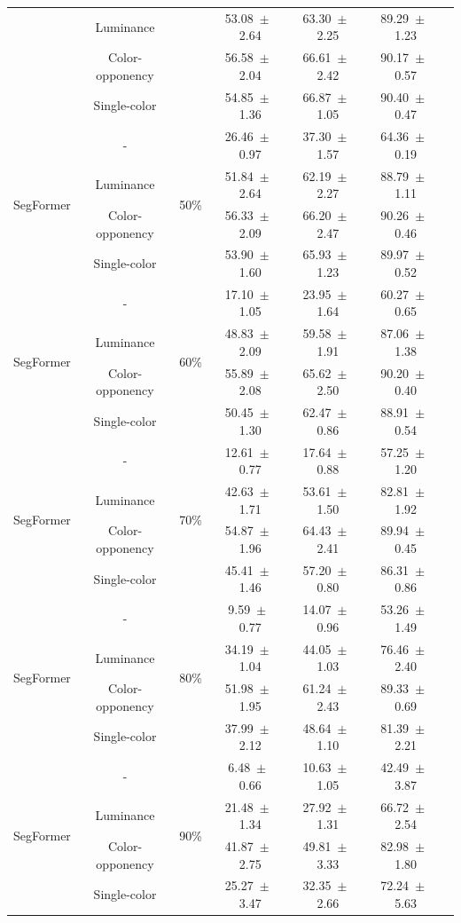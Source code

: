 \begin{table}[h]
\begin{tabular}{@{}lccc ccc@{}}
& Luminance & & 53.08~$\pm$~2.64 & 63.30~$\pm$~2.25 & 89.29~$\pm$~1.23 \\
& Color-opponency & & 56.58~$\pm$~2.04 & 66.61~$\pm$~2.42 & 90.17~$\pm$~0.57 \\
& Single-color & & 54.85~$\pm$~1.36 & 66.87~$\pm$~1.05 & 90.40~$\pm$~0.47 \\
\midrule
\multirow{4}{*}{SegFormer} & - & \multirow{4}{*}{50\%} & 26.46~$\pm$~0.97 & 37.30~$\pm$~1.57 & 64.36~$\pm$~0.19 \\
& Luminance & & 51.84~$\pm$~2.64 & 62.19~$\pm$~2.27 & 88.79~$\pm$~1.11 \\
& Color-opponency & & 56.33~$\pm$~2.09 & 66.20~$\pm$~2.47 & 90.26~$\pm$~0.46 \\
& Single-color & & 53.90~$\pm$~1.60 & 65.93~$\pm$~1.23 & 89.97~$\pm$~0.52 \\
\midrule
\multirow{4}{*}{SegFormer} & - & \multirow{4}{*}{60\%} & 17.10~$\pm$~1.05 & 23.95~$\pm$~1.64 & 60.27~$\pm$~0.65 \\
& Luminance & & 48.83~$\pm$~2.09 & 59.58~$\pm$~1.91 & 87.06~$\pm$~1.38 \\
& Color-opponency & & 55.89~$\pm$~2.08 & 65.62~$\pm$~2.50 & 90.20~$\pm$~0.40 \\
& Single-color & & 50.45~$\pm$~1.30 & 62.47~$\pm$~0.86 & 88.91~$\pm$~0.54 \\
\midrule
\multirow{4}{*}{SegFormer} & - & \multirow{4}{*}{70\%} & 12.61~$\pm$~0.77 & 17.64~$\pm$~0.88 & 57.25~$\pm$~1.20 \\
& Luminance & & 42.63~$\pm$~1.71 & 53.61~$\pm$~1.50 & 82.81~$\pm$~1.92 \\
& Color-opponency & & 54.87~$\pm$~1.96 & 64.43~$\pm$~2.41 & 89.94~$\pm$~0.45 \\
& Single-color & & 45.41~$\pm$~1.46 & 57.20~$\pm$~0.80 & 86.31~$\pm$~0.86 \\
\midrule
\multirow{4}{*}{SegFormer} & - & \multirow{4}{*}{80\%} & 9.59~$\pm$~0.77 & 14.07~$\pm$~0.96 & 53.26~$\pm$~1.49 \\
& Luminance & & 34.19~$\pm$~1.04 & 44.05~$\pm$~1.03 & 76.46~$\pm$~2.40 \\
& Color-opponency & & 51.98~$\pm$~1.95 & 61.24~$\pm$~2.43 & 89.33~$\pm$~0.69 \\
& Single-color & & 37.99~$\pm$~2.12 & 48.64~$\pm$~1.10 & 81.39~$\pm$~2.21 \\
\midrule
\multirow{4}{*}{SegFormer} & - & \multirow{4}{*}{90\%} & 6.48~$\pm$~0.66 & 10.63~$\pm$~1.05 & 42.49~$\pm$~3.87 \\
& Luminance & & 21.48~$\pm$~1.34 & 27.92~$\pm$~1.31 & 66.72~$\pm$~2.54 \\
& Color-opponency & & 41.87~$\pm$~2.75 & 49.81~$\pm$~3.33 & 82.98~$\pm$~1.80 \\
& Single-color & & 25.27~$\pm$~3.47 & 32.35~$\pm$~2.66 & 72.24~$\pm$~5.63 \\
\midrule
\bottomrule
\end{tabular}
\label{tab:sparse_results_segformer_acdc_fog}
\end{table}